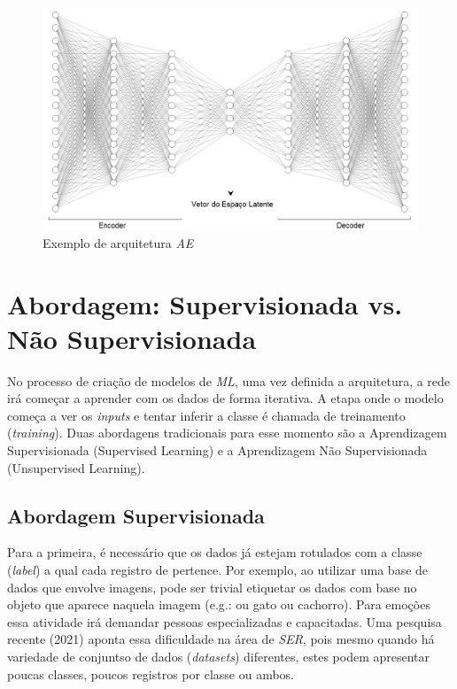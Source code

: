 \begin{figure}[!h]
\centering
\includegraphics[width=1.0\textwidth]{imagens/ex-ae.PNG}
\caption{\label{fig:exarqae}Exemplo de arquitetura \textit{AE}}
\end{figure}

\section{Abordagem: Supervisionada vs. Não Supervisionada}

No processo de criação de modelos de \textit{ML}, uma vez definida a arquitetura, a rede irá começar a aprender com os dados de forma iterativa. A etapa onde o modelo começa a ver os \textit{inputs} e tentar inferir a classe é chamada de treinamento (\textit{training}). Duas abordagens tradicionais para esse momento são a Aprendizagem Supervisionada (Supervised Learning) e a Aprendizagem Não Supervisionada (Unsupervised Learning).

\subsection{Abordagem Supervisionada}\label{supervisionada}

Para a primeira, é necessário que os dados já estejam rotulados com a classe (\textit{label}) a qual cada registro de pertence. Por exemplo, ao utilizar uma base de dados que envolve imagens, pode ser trivial etiquetar os dados com base no objeto que aparece naquela imagem (e.g.: ou gato ou cachorro). Para emoções essa atividade irá demandar pessoas especializadas e capacitadas. Uma pesquisa \cite{32} recente (2021) aponta essa dificuldade na área de \textit{SER}, pois mesmo quando há variedade de conjuntso de dados (\textit{datasets}) diferentes, estes podem apresentar poucas classes, poucos registros por classe ou ambos.

